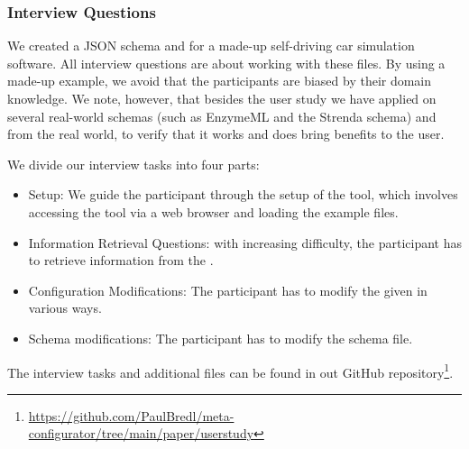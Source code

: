 \subsubsection{Interview Questions}
We created a JSON schema and \cfgfile{} for a made-up self-driving car simulation software.
All interview questions are about working with these files.
By using a made-up example, we avoid that the participants are biased by their domain knowledge.
We note, however, that besides the user study we have applied \toolname{} on several real-world schemas (such as EnzymeML\cite{pyenzyme} and the Strenda schema\cite{strenda}) and \cfgfiles{} from the real world, to verify that it works and does bring benefits to the user.

We divide our interview tasks into four parts:
\begin{itemize}
    \item Setup: We guide the participant through the setup of the tool, which involves accessing the tool via a web browser and loading the example files.
    \item Information Retrieval Questions: with increasing difficulty, the participant has to retrieve information from the \cfgfile{}.
    \item Configuration Modifications: The participant has to modify the given \cfgfile{} in various ways.
    \item Schema modifications: The participant has to modify the schema file.
\end{itemize}

The interview tasks and additional files can be found in out GitHub repository\footnote{\url{https://github.com/PaulBredl/meta-configurator/tree/main/paper/userstudy}}.

